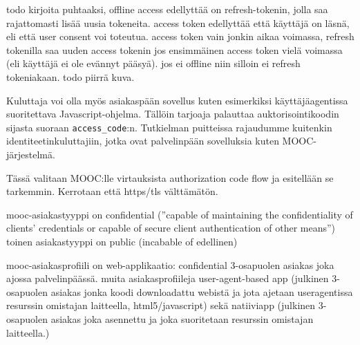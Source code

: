 \documentclass[finnish,gradu]{tktltiki}
\begin{document}
  todo kirjoita puhtaaksi, offline access edellyttää on refresh-tokenin, jolla saa rajattomasti lisää uusia tokeneita. access token edellyttää että käyttäjä on läsnä, eli että user consent voi toteutua. access token vain jonkin aikaa voimassa, refresh tokenilla saa uuden access tokenin jos ensimmäinen access token vielä voimassa (eli käyttäjä ei ole evännyt pääsyä). jos ei offline niin silloin ei refresh tokeniakaan. todo piirrä kuva.

  Kuluttaja voi olla myös asiakaspään sovellus kuten esimerkiksi käyttäjäagentissa suoritettava Javascript-ohjelma. Tällöin tarjoaja palauttaa auktorisointikoodin sijasta suoraan \verb!access_code!:n. Tutkielman puitteissa rajaudumme kuitenkin identiteetinkuluttajiin, jotka ovat palvelinpään sovelluksia kuten MOOC-järjestelmä.

  Tässä valitaan MOOC:lle virtauksista authorization code flow ja esitellään se tarkemmin.
  Kerrotaan että https/tls välttämätön.

  mooc-asiakastyyppi on confidential (''capable of maintaining the confidentiality of clients' credentials or capable of secure client authentication of other means'')
  toinen asiakastyyppi on public (incabable of edellinen)

  mooc-asiakasprofiili on web-applikaatio: confidential 3-osapuolen asiakas joka ajossa palvelinpäässä.
  muita asiakasprofiileja user-agent-based app (julkinen 3-osapuolen asiakas jonka koodi downloadattu webistä ja jota ajetaan useragentissa resurssin omistajan laitteella, html5/javascript) sekä natiiviapp (julkinen 3-osapuolen asiakas joka asennettu ja joka suoritetaan resurssin omistajan laitteella.)

\end{document}

